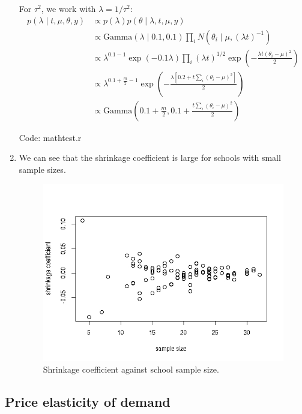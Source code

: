 \documentclass{article}
\begin{document}
\begin{enumerate}
For \(\tau^2\), we work with \(\lambda = 1/\tau^2\):
\begin{align*}
p(\lambda \mid t, \mu, \theta, y) &\propto p(\lambda) p(\theta \mid \lambda, t, \mu, y) \\
&\propto \mbox{Gamma}(\lambda \mid 0.1, 0.1) \prod_i N(\theta_i \mid \mu, (\lambda t) ^{-1})\\
&\propto \lambda^{0.1 - 1} \exp(-0.1\lambda) \prod_i (\lambda t)^{1/2} \exp \left( - \frac{\lambda t (\theta_i - \mu)^2}{2} \right)\\
&\propto \lambda^{0.1 + \frac{m}{2} - 1} \exp \left( -\frac{\lambda[0.2 + t\sum_i(\theta_i - \mu)^2]}{2}\right)\\
&\propto \mbox{Gamma}\left(0.1 + \frac{m}{2}, 0.1 + \frac{t\sum_i(\theta_i - \mu)^2}{2} \right)
\end{align*}

Code: mathtest.r

\item We can see that the shrinkage coefficient is large for schools with small sample sizes.
\begin{figure}[h]
\includegraphics[width=\textwidth]{mathtest.jpeg}
\caption{Shrinkage coefficient against school sample size.}
\end{figure}

\end{enumerate}


\subsection{Price elasticity of demand}
\end{document}
